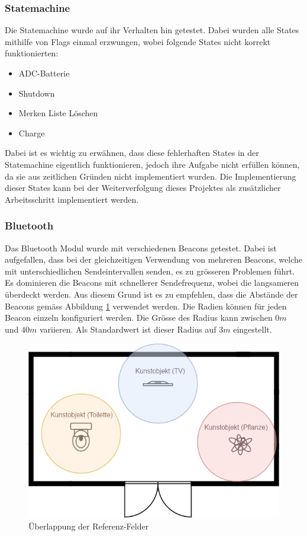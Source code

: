 \subsubsection{Statemachine}
Die Statemachine wurde auf ihr Verhalten hin getestet. Dabei wurden alle States mithilfe von Flags einmal erzwungen, wobei folgende States nicht korrekt funktionierten:

\begin{itemize}
	\item ADC-Batterie 
	\item Shutdown
	\item Merken Liste Löschen
	\item Charge
\end{itemize}

Dabei ist es wichtig zu erwähnen, dass diese {\glqq fehlerhaften States\grqq} in der Statemachine eigentlich funktionieren, jedoch ihre Aufgabe nicht erfüllen können, da sie aus zeitlichen Gründen nicht implementiert wurden. Die Implementierung dieser States kann bei der Weiterverfolgung dieses Projektes als zusätzlicher Arbeitsschritt implementiert werden.

\subsubsection{Bluetooth}
Das Bluetooth Modul wurde mit verschiedenen Beacons getestet. Dabei ist aufgefallen, dass bei der gleichzeitigen Verwendung von mehreren Beacons, welche mit unterschiedlichen Sendeintervallen senden, es zu grösseren Problemen führt. Es dominieren die Beacons mit schnellerer Sendefrequenz, wobei die langsameren überdeckt werden. Aus diesem Grund ist es zu empfehlen, dass die Abstände der Beacons gemäss Abbildung \ref{fig:ref_felder} verwendet werden. Die Radien können für jeden Beacon einzeln konfiguriert werden. Die Grösse des Radius kann zwischen $0m$ und $40m$ variieren. Als Standardwert ist dieser Radius auf $3m$ eingestellt.

\begin{figure}[H]
	\begin{center}
		\includegraphics[width=120mm]{data/validierung_software_ref_felder.png}
		\caption[Überlappung der Referenz-Felder]{Überlappung der Referenz-Felder} %
		\label{fig:ref_felder}
	\end{center}
\end{figure}

